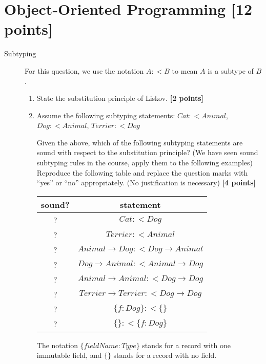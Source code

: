 \documentclass{article}
\begin{document}
\newpage
\section{Object-Oriented Programming [12 points]}

\begin{description}

\item[Subtyping]
  For this question, we use the notation $A :< B$ to mean $A$ is a
  subtype of $B$.

\begin{enumerate}
\item State the substitution principle of Liskov.  \hfill{\textbf{[2
      points]}}

\item Assume the following subtyping statements:
$Cat :< Animal$, $Dog :< Animal$, $Terrier :< Dog$

Given the above, which of the following subtyping statements are
sound with respect to the substitution principle? (We have seen
sound subtyping rules in the course, apply them to the following
examples) Reproduce the following table and replace the question marks with
``yes'' or ``no'' appropriately. (No justification is necessary)
\hfill{\textbf{[4 points]}}

\newcommand{\mutable}{\mathbf{mutable}}
\newcommand{\constant}{\mathbf{constant}}

\begin{center}
\begin{tabular}{cc}
sound?
 & statement
\\
\hline
?
 & $Cat :< Dog$
\\
?
 & $Terrier :< Animal$
\\
?
 & $Animal → Dog :< Dog → Animal$
\\
?
 & $Dog → Animal :< Animal → Dog$
\\
?
 & $Animal → Animal :< Dog → Dog$
\\
?
 & $Terrier → Terrier :< Dog → Dog$
\\
?
 & $\{ f : Dog \} :< \{ \}$
\\
?
 & $\{ \} :< \{ f : Dog \}$
\\
\end{tabular}
\end{center}

The notation $\{ fieldName : Type \}$ stands for a record with one
immutable field, and $\{ \}$ stands for a record with no field.


\end{enumerate}


\end{description}
\end{document}
